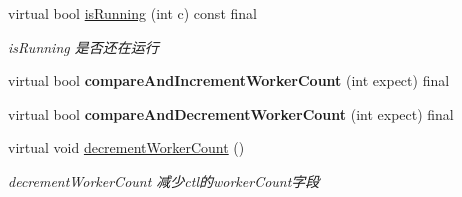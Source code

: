 \begin{DoxyCompactItemize}
virtual bool \hyperlink{classThreadPoolExecutor_a841ae2189d6f85b9df9f69dec5375341}{is\+Running} (int c) const final
\begin{DoxyCompactList}\small\item\em is\+Running 是否还在运行 \end{DoxyCompactList}\item 
\mbox{\label{classThreadPoolExecutor_ac1bcafe65f800aeb9feade5f31b64fde}} 
virtual bool {\bfseries compare\+And\+Increment\+Worker\+Count} (int expect) final
\item 
\mbox{\label{classThreadPoolExecutor_ac40053b88cd669526a0a6225b5e1a86e}} 
virtual bool {\bfseries compare\+And\+Decrement\+Worker\+Count} (int expect) final
\item 
\mbox{\label{classThreadPoolExecutor_ab19dcfa8af5864274e66bccf40255484}} 
virtual void \hyperlink{classThreadPoolExecutor_ab19dcfa8af5864274e66bccf40255484}{decrement\+Worker\+Count} ()
\begin{DoxyCompactList}\small\item\em decrement\+Worker\+Count 减少ctl的worker\+Count字段 \end{DoxyCompactList}\end{DoxyCompactItemize}
